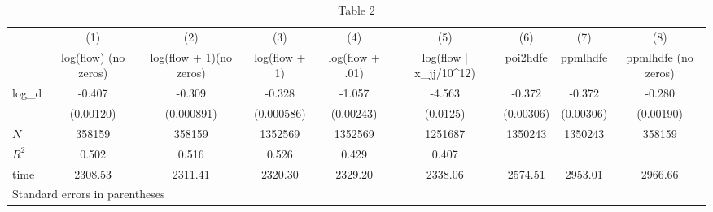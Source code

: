 \begin{table}[htbp]\centering
\caption{Table 2}
\begin{tabular}{l*{8}{c}}
\hline\hline
            &\multicolumn{1}{c}{(1)}&\multicolumn{1}{c}{(2)}&\multicolumn{1}{c}{(3)}&\multicolumn{1}{c}{(4)}&\multicolumn{1}{c}{(5)}&\multicolumn{1}{c}{(6)}&\multicolumn{1}{c}{(7)}&\multicolumn{1}{c}{(8)}\\
            &\multicolumn{1}{c}{log(flow) (no zeros)}&\multicolumn{1}{c}{log(flow + 1)(no zeros)}&\multicolumn{1}{c}{log(flow + 1)}&\multicolumn{1}{c}{log(flow + .01)}&\multicolumn{1}{c}{log(flow | x\_jj/10^12)}&\multicolumn{1}{c}{poi2hdfe}&\multicolumn{1}{c}{ppmlhdfe}&\multicolumn{1}{c}{ppmlhdfe (no zeros)}\\
\hline
log\_d       &      -0.407&      -0.309&      -0.328&      -1.057&      -4.563&      -0.372&      -0.372&      -0.280\\
            &   (0.00120)&  (0.000891)&  (0.000586)&   (0.00243)&    (0.0125)&   (0.00306)&   (0.00306)&   (0.00190)\\
\hline
\(N\)       &      358159&      358159&     1352569&     1352569&     1251687&     1350243&     1350243&      358159\\
\(R^{2}\)   &       0.502&       0.516&       0.526&       0.429&       0.407&            &            &            \\
time        &     2308.53&     2311.41&     2320.30&     2329.20&     2338.06&     2574.51&     2953.01&     2966.66\\
\hline\hline
\multicolumn{9}{l}{\footnotesize Standard errors in parentheses}\\
\end{tabular}
\end{table}
